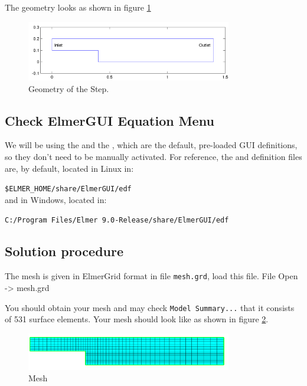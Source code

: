 The geometry looks as shown in figure \ref{fg:step_geometry} 

\begin{figure}[H]
\centering
\includegraphics[width=0.8\textwidth]{step_geometry.png}
\caption{Geometry of the Step.}\label{fg:step_geometry}
\end{figure}  

\subsection*{Check ElmerGUI Equation Menu}

We will be using the  and the , which are the default, pre-loaded GUI definitions, so they don't need to be manually activated.  For reference, the  \texttt{} and \texttt{} definition files are, by default, located in Linux in:

\texttt{\$ELMER\_HOME/share/ElmerGUI/edf}\\

and in Windows, located in:

\texttt{C:/Program Files/Elmer 9.0-Release/share/ElmerGUI/edf}\\

\subsection*{Solution procedure}

The mesh is given in ElmerGrid format in file \texttt{mesh.grd}, load this file.
\ttbegin
File 
  Open -> mesh.grd
\ttend

You should obtain your mesh and may check \texttt{Model Summary...} that it consists of 531 surface elements.  Your mesh should look like as shown in figure \ref{fg:step_mesh}.

\begin{figure}[H]
\centering
\includegraphics[width=0.8\textwidth]{step_mesh}
\caption{Mesh}\label{fg:step_mesh}
\end{figure}  


